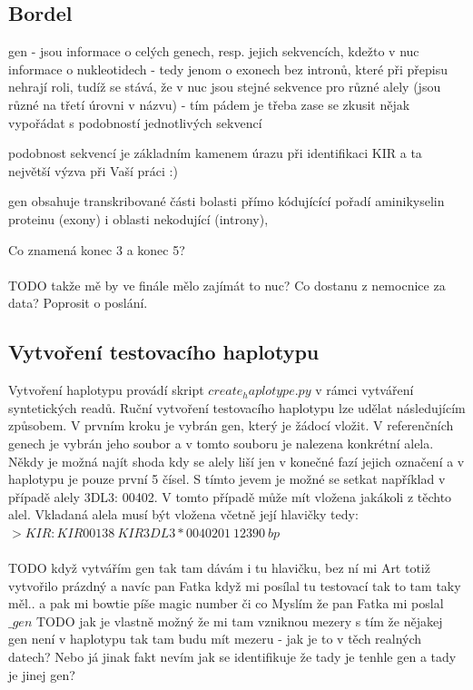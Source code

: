 \documentclass[czech,DP]{thesiskiv}
\numberwithin{equation}{section}
\begin{document}
\subsection{Bordel}
gen - jsou informace o celých genech, resp. jejich sekvencích, kdežto v nuc informace o nukleotidech - tedy jenom o exonech bez intronů, které při přepisu nehrají roli, tudíž se stává, že v nuc jsou stejné sekvence pro různé alely (jsou různé na třetí úrovni v názvu) - tím pádem je třeba zase se zkusit nějak vypořádat s podobností jednotlivých sekvencí

podobnost sekvencí je základním kamenem úrazu při identifikaci KIR a ta největší výzva při Vaší práci :)

gen obsahuje transkribované části bolasti přímo kódujícící pořadí aminikyselin proteinu (exony) i oblasti nekodující (introny), 

Co znamená konec 3 a konec 5? 
\\
\\
TODO takže mě by ve finále mělo zajímát to nuc? Co dostanu z nemocnice za data? Poprosit o poslání. 

\subsection{Vytvoření testovacího haplotypu}
Vytvoření haplotypu provádí skript $create_haplotype.py$ v rámci vytváření syntetických readů. Ruční vytvoření testovacího haplotypu lze udělat následujícím způsobem. V prvním kroku je vybrán gen, který je žádocí vložit. V referenčních genech je vybrán jeho soubor a v tomto souboru je nalezena konkrétní alela. Někdy je možná najít shoda kdy se alely liší jen v konečné fazí jejich označení a v haplotypu je pouze první 5 čísel. S tímto jevem je možné se setkat například v případě alely 3DL3: 00402. V tomto případě může mít vložena jakákoli z těchto alel. Vkladaná alela musí být vložena včetně její hlavičky tedy: $>KIR:KIR00138 \: KIR3DL3*0040201 \: 12390 \: bp$ 
\\
\\  
TODO když vytvářím gen tak tam dávám i tu hlavičku, bez ní mi Art totiž vytvořilo prázdný a navíc pan Fatka když mi posílal tu testovací tak to tam taky měl.. a pak mi bowtie píše magic number či co 
Myslím že pan Fatka mi poslal $\_gen$
TODO jak je vlastně možný že mi tam vzniknou mezery s tím že nějakej gen není v haplotypu tak tam budu mít mezeru - jak je to v těch realných datech?
Nebo já jinak fakt nevím jak se identifikuje že tady je tenhle gen a tady je jinej gen?  
\end{document}
